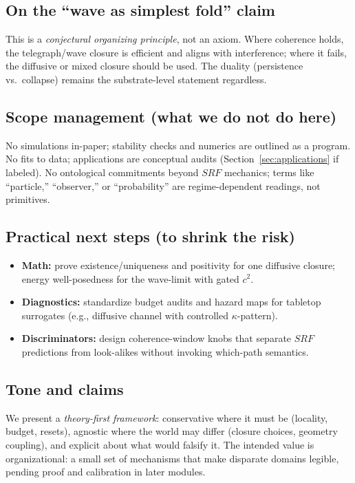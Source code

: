 \documentclass[12pt]{article}
\newcommand{\SRF}{\mathcal{F}_{\mathrm{SR}}}
\def\SRF{SRF}%
\def\mathcal#1{#1}%
\def\mathrm#1{#1}%
\begin{document}
\subsection{On the ``wave as simplest fold'' claim}
This is a \emph{conjectural organizing principle}, not an axiom. Where coherence holds, the telegraph/wave closure is efficient and aligns with interference; where it fails, the diffusive or mixed closure should be used. The duality (persistence vs.\ collapse) remains the substrate-level statement regardless.

\subsection{Scope management (what we do not do here)}
No simulations in-paper; stability checks and numerics are outlined as a program. No fits to data; applications are conceptual audits (Section~\ref{sec:applications} if labeled). No ontological commitments beyond $\SRF$ mechanics; terms like ``particle,'' ``observer,'' or ``probability'' are regime-dependent readings, not primitives.

\subsection{Practical next steps (to shrink the risk)}
\begin{itemize}
  \item \textbf{Math:} prove existence/uniqueness and positivity for one diffusive closure; energy well-posedness for the wave-limit with gated $c^2$.
  \item \textbf{Diagnostics:} standardize budget audits and hazard maps for tabletop surrogates (e.g., diffusive channel with controlled $\kappa$-pattern).
  \item \textbf{Discriminators:} design coherence-window knobs that separate $\SRF$ predictions from look-alikes without invoking which-path semantics.
\end{itemize}

\subsection{Tone and claims}
We present a \emph{theory-first framework}: conservative where it must be (locality, budget, resets), agnostic where the world may differ (closure choices, geometry coupling), and explicit about what would falsify it. The intended value is organizational: a small set of mechanisms that make disparate domains legible, pending proof and calibration in later modules.
\end{document}

